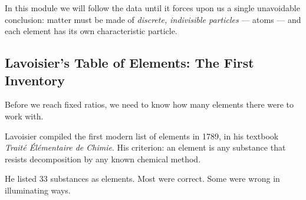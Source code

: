\documentclass[12pt, a4paper]{book}
\theoremstyle{definition}
\begin{document}
\vspace{0.5em}

In this module we will follow the data until it forces upon us
a single unavoidable conclusion:
matter must be made of \emph{discrete, indivisible particles}
--- atoms --- and each element has its own characteristic particle.

\subsection{Lavoisier's Table of Elements: The First Inventory}

Before we reach fixed ratios, we need to know how many
elements there were to work with.

Lavoisier compiled the first modern list of elements in 1789,
in his textbook \textit{Traité Élémentaire de Chimie}.
His criterion: an element is any substance that resists
decomposition by any known chemical method.

He listed 33 substances as elements.
Most were correct.
Some were wrong in illuminating ways.
\end{document}
